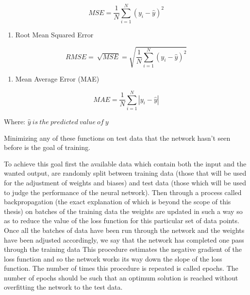 \begin{equation}
MSE = \frac{1}{N}\sum_{i = 1}^{N}\left( y_{i} - \hat{y} \right)^{2}
\end{equation}

\begin{enumerate}
\def\labelenumi{\arabic{enumi}.}
\setcounter{enumi}{1}
\item
  Root Mean Squared Error
\end{enumerate}

\begin{equation}
RMSE = \ \sqrt{MSE} = \sqrt{\frac{1}{N}\sum_{i = 1}^{N}\left( y_{i} - \hat{y} \right)^{2}}
\end{equation}

\begin{enumerate}
\def\labelenumi{\arabic{enumi}.}
\setcounter{enumi}{2}
\item
  Mean Average Error (MAE)
\end{enumerate}

\begin{equation}
MAE = \frac{1}{N}\sum_{i = 1}^{N}{|y_{i} - \hat{y}|}
\label{eq:MAE}
\end{equation}

Where: $\hat{y}\ is\ the\ predicted\ value\ of\ y$

Minimizing any of these functions on test data that the network hasn't
seen before is the goal of training.

To achieve this goal first the available data which contain both the input and the wanted output, are randomly split between training data (those that will be used for the adjustment of weights and biases) and test data (those which will be used to judge the performance of the neural network). Then through a process called backpropagation (the exact explanation of which is beyond the scope of this thesis) on batches of the training data the weights are updated in such a way so as to reduce the value of the loss function for this particular set of data points. Once all the batches of data have been run through the network and the weights have been adjusted accordingly, we say that the network has completed one pass through the training data This procedure estimates the negative gradient of the loss function and so the network works its way down the slope of the loss function. The number of times this procedure is repeated is called epochs. The number of epochs should be such that an optimum solution is reached without overfitting the network to the test data.

